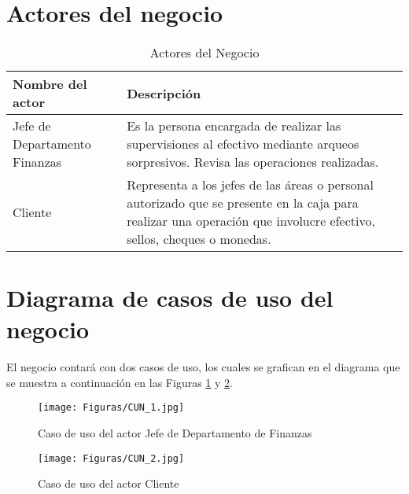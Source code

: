\section{Actores del negocio}
\begin{table}[ht]
	\begin{supertabular}{ |p{6cm}|p{10cm}| }
		\hline
		\textbf{Nombre del actor}
		& \textbf{Descripción} \\ \hline
		
		Jefe de Departamento Finanzas
		& Es la persona encargada de realizar las supervisiones al efectivo mediante arqueos sorpresivos. Revisa las operaciones realizadas. \\ \hline
		
		Cliente
		& Representa a los jefes de las áreas o personal autorizado que se presente en la caja para realizar una operación que involucre efectivo, sellos, cheques o monedas. \\
		
		\hline
	\end{supertabular}
	\caption[Actores del Negocio]{Actores del Negocio}
	\label{table:act_neg}
\end{table}

\section{Diagrama de casos de uso del negocio}
\paragraph{}El negocio contará con dos casos de uso, los cuales se grafican en el diagrama que se muestra a continuación en las Figuras \ref{fig:CUN_1} y \ref{fig:CUN_2}.

\begin{figure}[H] %
	\centering
	\texttt{[image: Figuras/CUN\_1.jpg]}
	\caption{Caso de uso del actor Jefe de Departamento de Finanzas}
	\label{fig:CUN_1}
\end{figure}

\begin{figure}[H] %
	\centering
	\texttt{[image: Figuras/CUN\_2.jpg]}
	\caption{Caso de uso del actor Cliente}
	\label{fig:CUN_2}
\end{figure}


